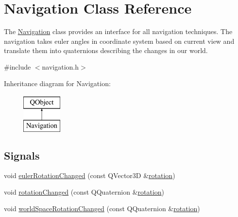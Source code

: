 \hypertarget{class_navigation}{\section{Navigation Class Reference}
\label{class_navigation}
}


The \hyperlink{class_navigation}{Navigation} class provides an interface for all navigation techniques.  The navigation takes euler angles in coordinate system based on current view and translate them into quaternions describing the changes in our world.  




{\ttfamily \#include $<$navigation.\+h$>$}

Inheritance diagram for Navigation\+:\begin{figure}[H]
\begin{center}
\leavevmode
\includegraphics[height=2.000000cm]{class_navigation}
\end{center}
\end{figure}
\subsection*{Signals}
\begin{DoxyCompactItemize}
\item 
void \hyperlink{class_navigation_a46da025077023f9c225d3f5dfe870324}{euler\+Rotation\+Changed} (const Q\+Vector3\+D \&\hyperlink{class_navigation_a264e178e874b62aec38c9986a234d044}{rotation})
\item 
void \hyperlink{class_navigation_ac54fe5d8be2858c2988a9f5158d2d58e}{rotation\+Changed} (const Q\+Quaternion \&\hyperlink{class_navigation_a264e178e874b62aec38c9986a234d044}{rotation})
\item 
void \hyperlink{class_navigation_aa8de8f9227de65da000d1ce730821bab}{world\+Space\+Rotation\+Changed} (const Q\+Quaternion \&\hyperlink{class_navigation_a264e178e874b62aec38c9986a234d044}{rotation})
\end{DoxyCompactItemize}
